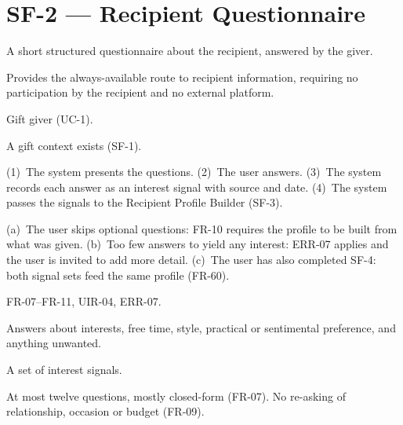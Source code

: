 \documentclass[11pt,a4paper]{report}
\begin{document}
\section{SF-2 --- Recipient Questionnaire}
\begin{description}[style=nextline,leftmargin=0pt]
\item[Description] A short structured questionnaire about the recipient, answered by the giver.
\item[Purpose] Provides the always-available route to recipient information, requiring no participation by the recipient and no external platform.
\item[Actors] Gift giver (UC-1).
\item[Preconditions] A gift context exists (SF-1).
\item[Main flow] (1)~The system presents the questions. (2)~The user answers. (3)~The system records each answer as an interest signal with source and date. (4)~The system passes the signals to the Recipient Profile Builder (SF-3).
\item[Alternative and exception flows] (a)~The user skips optional questions: FR-10 requires the profile to be built from what was given. (b)~Too few answers to yield any interest: ERR-07 applies and the user is invited to add more detail. (c)~The user has also completed SF-4: both signal sets feed the same profile (FR-60).
\item[Requirements] FR-07--FR-11, UIR-04, ERR-07.
\item[Inputs] Answers about interests, free time, style, practical or sentimental preference, and anything unwanted.
\item[Outputs] A set of interest signals.
\item[Constraints] At most twelve questions, mostly closed-form (FR-07). No re-asking of relationship, occasion or budget (FR-09).
\end{description}
\end{document}
